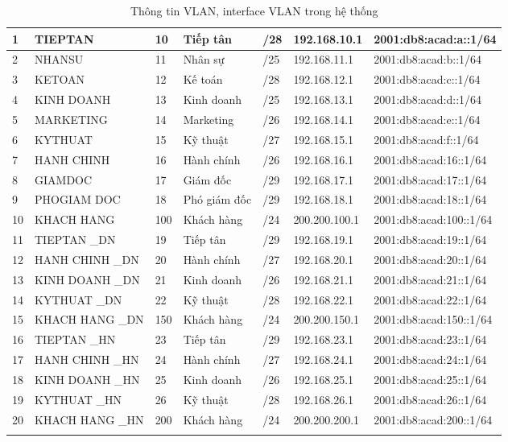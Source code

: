 \documentclass[12pt,a4paper]{report}
\begin{document}
\begin{center}
\begin{longtable}{|p{}|p{}|p{}|p{}|p{}|p{}|p{}|}
\hline  1  &  TIEPTAN  &  10  &  Tiếp tân  &  /28  &  192.168.10.1  &  2001:db8:acad:a::1/64 \\
\hline  2  &  NHANSU  &  11  &  Nhân sự  &  /25  &  192.168.11.1  &  2001:db8:acad:b::1/64 \\
\hline  3  &  KETOAN  &  12  &  Kế toán  &  /28  &  192.168.12.1  &  2001:db8:acad:c::1/64 \\
\hline  4  &  KINH DOANH  &  13  &  Kinh doanh  &  /25  &  192.168.13.1  &  2001:db8:acad:d::1/64 \\
\hline  5  &  MARKETING  &  14  &  Marketing  &  /26  &  192.168.14.1  &  2001:db8:acad:e::1/64 \\
\hline  6  &  KYTHUAT  &  15  &  Kỹ thuật  &  /27  &  192.168.15.1  &  2001:db8:acad:f::1/64 \\
\hline  7  &  HANH CHINH  &  16  &  Hành chính  &  /26  &  192.168.16.1  &  2001:db8:acad:16::1/64 \\
\hline  8  &  GIAMDOC  &  17  &  Giám đốc  &  /29  &  192.168.17.1  &  2001:db8:acad:17::1/64 \\
\hline  9  &  PHOGIAM DOC  &  18  &  Phó giám đốc  &  /29  &  192.168.18.1  &  2001:db8:acad:18::1/64 \\
\hline  10  &  KHACH HANG  &  100  &  Khách hàng  &  /24  &  200.200.100.1  &  2001:db8:acad:100::1/64 \\
\hline  11  &  TIEPTAN \_DN  &  19  &  Tiếp tân  &  /29  &  192.168.19.1  &  2001:db8:acad:19::1/64 \\
\hline  12  &  HANH CHINH \_DN  &  20  &  Hành chính  &  /27  &  192.168.20.1  &  2001:db8:acad:20::1/64 \\
\hline  13  &  KINH DOANH \_DN  &  21  &  Kinh doanh  &  /26  &  192.168.21.1  &  2001:db8:acad:21::1/64 \\
\hline  14  &  KYTHUAT \_DN  &  22  &  Kỹ thuật  &  /28  &  192.168.22.1  &  2001:db8:acad:22::1/64 \\
\hline  15  &  KHACH HANG \_DN  &  150  &  Khách hàng  &  /24  &  200.200.150.1  &  2001:db8:acad:150::1/64 \\
\hline  16  &  TIEPTAN \_HN  &  23  &  Tiếp tân  &  /29  &  192.168.23.1  &  2001:db8:acad:23::1/64 \\
\hline  17  &  HANH CHINH \_HN  &  24  &  Hành chính  &  /27  &  192.168.24.1  &  2001:db8:acad:24::1/64 \\
\hline  18  &  KINH DOANH \_HN  &  25  &  Kinh doanh  &  /26  &  192.168.25.1  &  2001:db8:acad:25::1/64 \\
\hline  19  &  KYTHUAT \_HN  &  26  &  Kỹ thuật  &  /28  &  192.168.26.1  &  2001:db8:acad:26::1/64 \\
\hline  20  &  KHACH HANG \_HN  &  200  &  Khách hàng  &  /24  &  200.200.200.1  &  2001:db8:acad:200::1/64 \\
 
 
\hline
   \caption{Thông tin VLAN, interface VLAN trong hệ thống}
    \label{hinh33}\\
\end{longtable}
   
\end{center}
\end{document}
